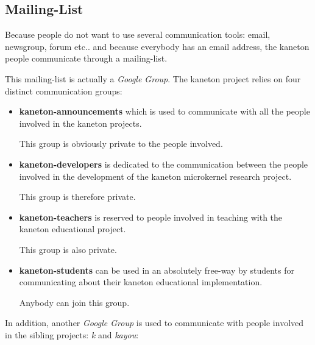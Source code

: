 %
%
%
%
%
%

%
%

\subsection{Mailing-List}
\label{section:mailing-list}

Because people do not want to use several communication tools: email,
newsgroup, forum etc.. and because everybody has an email address, the
kaneton people communicate through a mailing-list.

This mailing-list is actually a \textit{Google Group}. The kaneton
project relies on four distinct communication groups:

\begin{itemize}
  \item
    \textbf{kaneton-announcements} which is used to communicate with all the
    people involved in the kaneton projects.

    \-

    This group is obviously private to the people involved.
  \item
    \textbf{kaneton-developers} is dedicated to the communication between the
    people involved in the development of the kaneton microkernel research
    project.

    \-

    This group is therefore private.
  \item
    \textbf{kaneton-teachers} is reserved to people involved in teaching
    with the kaneton educational project.

    \-

    This group is also private.
  \item
    \textbf{kaneton-students} can be used in an absolutely free-way by
    students for communicating about their kaneton educational implementation.

    \-

    Anybody can join this group.
\end{itemize}

In addition, another \textit{Google Group} is used to communicate with people
involved in the sibling projects: \textit{k} and \textit{kayou}:

